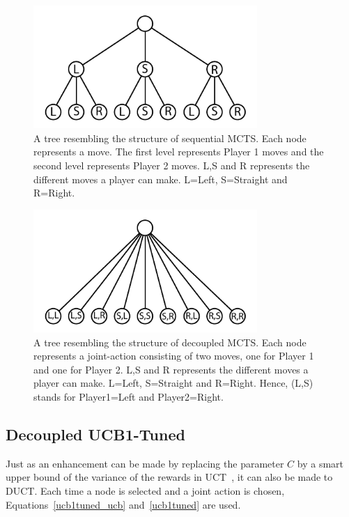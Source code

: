 \documentclass{article}
\begin{document}
\begin{figure}
\begin{center}
\includegraphics[width=8.5cm]{images/graph_seq_uct.pdf}
\caption{A tree resembling the structure of sequential MCTS. Each node represents a move. The first level represents Player 1 moves and the second level represents Player 2 moves. L,S and R represents the different moves a player can make. L=Left, S=Straight and R=Right.\label{fig:graph_suct}}
\end{center}
\end{figure}

\begin{figure}
\begin{center}
\includegraphics[width=8.5cm]{images/graph_dec_uct.pdf}
\caption{A tree resembling the structure of decoupled MCTS. Each node represents a joint-action consisting of two moves, one for Player 1 and one for Player 2. L,S and R represents the different moves a player can make. L=Left, S=Straight and R=Right. Hence, (L,S) stands for Player1=Left and Player2=Right.\label{fig:graph_duct}}
\end{center}
\end{figure}

\subsection{Decoupled UCB1-Tuned}
\label{subsec:decoupled_ucb1_tuned}
Just as an enhancement can be made by replacing the parameter $C$ by a smart upper bound of the variance of the rewards in UCT~\cite{cig_paper}, it can also be made to DUCT. Each time a node is selected and a joint action is chosen, Equations~\ref{ucb1tuned_ucb} and~\ref{ucb1tuned} are used.
\end{document}
